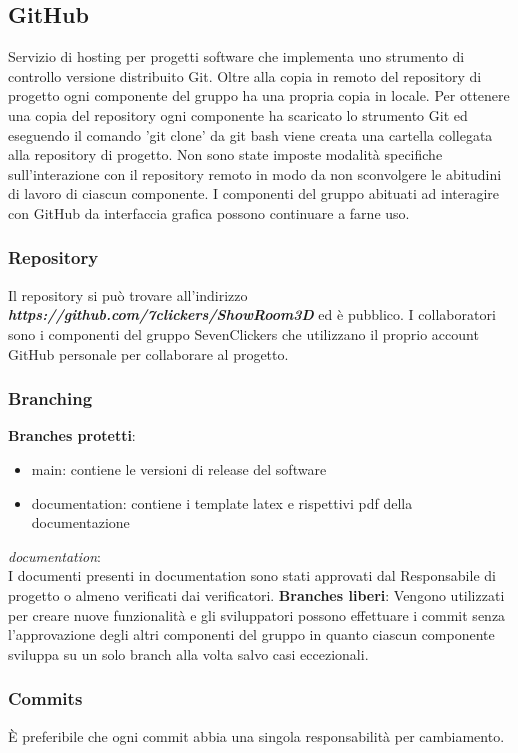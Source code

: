 \subsection{GitHub}
Servizio di hosting per progetti software che implementa uno strumento di controllo versione distribuito Git.
Oltre alla copia in remoto del repository di progetto ogni componente del gruppo ha una propria copia in locale.
Per ottenere una copia del repository ogni componente ha scaricato lo strumento Git ed eseguendo il 
comando 'git clone' da git bash viene creata una cartella collegata alla repository di progetto.
Non sono state imposte modalità specifiche sull'interazione con il repository remoto in modo da non sconvolgere le abitudini di lavoro di 
ciascun componente.
I componenti del gruppo abituati ad interagire con GitHub da interfaccia grafica possono continuare a farne uso.
\subsubsection{Repository}
Il repository si può trovare all'indirizzo \textbf{\textit{https://github.com/7clickers/ShowRoom3D}} ed è pubblico. 
I collaboratori sono i componenti del gruppo SevenClickers che utilizzano il proprio account GitHub personale per collaborare al progetto.
\subsubsection{Branching}
\textbf{Branches protetti}:
    \begin{itemize} 
        \item main: contiene le versioni di release del software
        \item documentation: contiene i template latex e rispettivi pdf della documentazione
    \end{itemize}
\textit{documentation}:\\
I documenti presenti in documentation sono stati approvati dal Responsabile di progetto o almeno verificati dai verificatori.
\textbf{Branches liberi}: 
Vengono utilizzati per creare nuove funzionalità e gli sviluppatori possono effettuare i commit senza l'approvazione degli altri componenti del gruppo
in quanto ciascun componente sviluppa su un solo branch alla volta salvo casi eccezionali.
\subsubsection{Commits}
È preferibile che ogni commit abbia una singola responsabilità per cambiamento.

